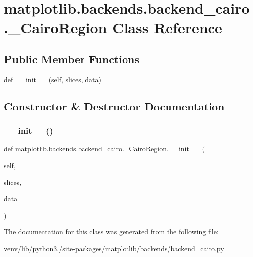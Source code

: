 \hypertarget{classmatplotlib_1_1backends_1_1backend__cairo_1_1__CairoRegion}{}\section{matplotlib.\+backends.\+backend\+\_\+cairo.\+\_\+\+Cairo\+Region Class Reference}
\label{classmatplotlib_1_1backends_1_1backend__cairo_1_1__CairoRegion}
\subsection*{Public Member Functions}
\begin{DoxyCompactItemize}
\item 
def \hyperlink{classmatplotlib_1_1backends_1_1backend__cairo_1_1__CairoRegion_ae426a9d90968c12246ef61df25903f1c}{\+\_\+\+\_\+init\+\_\+\+\_\+} (self, slices, data)
\end{DoxyCompactItemize}


\subsection{Constructor \& Destructor Documentation}
\mbox{\label{classmatplotlib_1_1backends_1_1backend__cairo_1_1__CairoRegion_ae426a9d90968c12246ef61df25903f1c}} 
\subsubsection{\texorpdfstring{\+\_\+\+\_\+init\+\_\+\+\_\+()}{\_\_init\_\_()}}
{\footnotesize\ttfamily def matplotlib.\+backends.\+backend\+\_\+cairo.\+\_\+\+Cairo\+Region.\+\_\+\+\_\+init\+\_\+\+\_\+ (\begin{DoxyParamCaption}\item[{}]{self,  }\item[{}]{slices,  }\item[{}]{data }\end{DoxyParamCaption})}



The documentation for this class was generated from the following file\+:\begin{DoxyCompactItemize}
\item 
venv/lib/python3./site-\/packages/matplotlib/backends/\hyperlink{backend__cairo_8py}{backend\+\_\+cairo.\+py}\end{DoxyCompactItemize}
